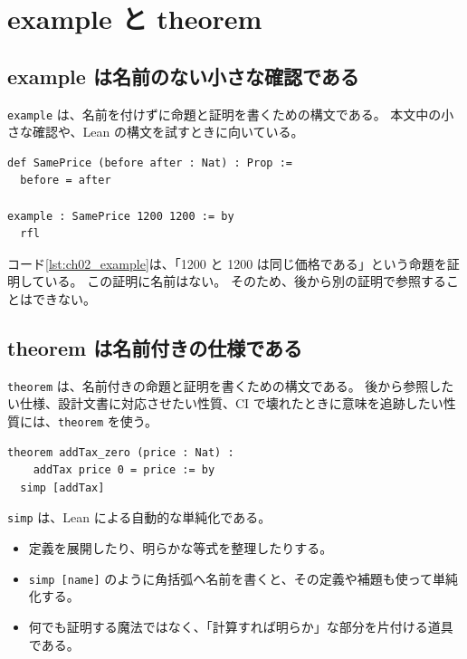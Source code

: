 \section{example と theorem}

\subsection{example は名前のない小さな確認である}

\texttt{example} は、名前を付けずに命題と証明を書くための構文である。
本文中の小さな確認や、Lean の構文を試すときに向いている。

\begin{listing}[htbp]
\begin{verbatim}
def SamePrice (before after : Nat) : Prop :=
  before = after

example : SamePrice 1200 1200 := by
  rfl
\end{verbatim}
\caption{example による小さな証明}
\label{lst:ch02_example}
\end{listing}

コード\ref{lst:ch02_example}は、「1200 と 1200 は同じ価格である」という命題を証明している。
この証明に名前はない。
そのため、後から別の証明で参照することはできない。

\subsection{theorem は名前付きの仕様である}

\texttt{theorem} は、名前付きの命題と証明を書くための構文である。
後から参照したい仕様、設計文書に対応させたい性質、CI で壊れたときに意味を追跡したい性質には、\texttt{theorem} を使う。

\begin{listing}[htbp]
\begin{verbatim}
theorem addTax_zero (price : Nat) :
    addTax price 0 = price := by
  simp [addTax]
\end{verbatim}
\caption{theorem による名前付き仕様}
\label{lst:ch02_theorem}
\end{listing}

\begin{syntaxbox}
\texttt{simp} は、Lean による自動的な単純化である。
\begin{itemize}
\item 定義を展開したり、明らかな等式を整理したりする。
\item \texttt{simp [name]} のように角括弧へ名前を書くと、その定義や補題も使って単純化する。
\item 何でも証明する魔法ではなく、「計算すれば明らか」な部分を片付ける道具である。
\end{itemize}
\end{syntaxbox}


